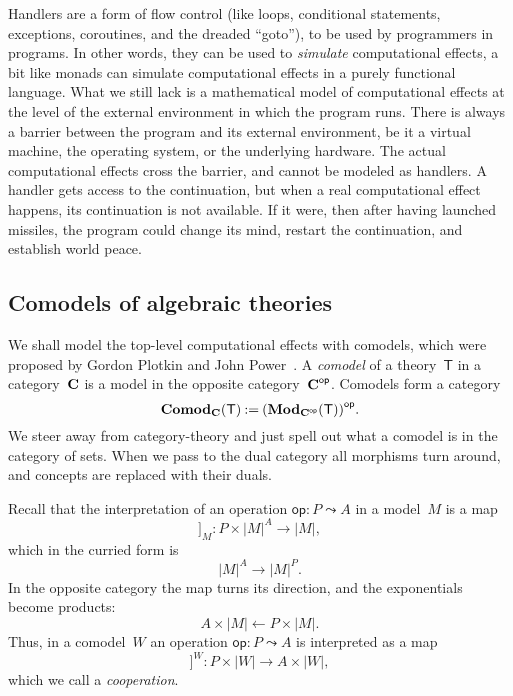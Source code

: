 \documentclass{amsart}
\newcommand{\theory}[1]{\mathsf{#1}} %
\newcommand{\ModC}[2]{\text{\textbf{Mod}}_{#1}(\theory{#2})} %
\newcommand{\ComodC}[2]{\text{\textbf{Comod}}_{#1}(\theory{#2})} %
\newcommand{\category}[1]{\text{\textbf{#1}}} %
\newcommand{\opcat}[1]{{#1}^{\mathsf{op}}} %
\newcommand{\opdecl}[3]{#1 : #2 \leadsto #3} %
\newcommand{\sem}[1]{[\![#1]\!]} %
\newcommand{\defeq}{\mathbin{{:}{=}}} %
\newcommand{\kode}[1]{\mathsf{#1}}
\begin{document}
Handlers are a form of flow control (like loops, conditional statements,
exceptions, coroutines, and the dreaded ``goto''), to be used by programmers in
programs. In other words, they can be used to \emph{simulate} computational
effects, a bit like monads can simulate computational effects in a purely
functional language. What we still lack is a mathematical model of computational
effects at the level of the external environment in which the program runs. There is
always a barrier between the program and its external environment, be it a
virtual machine, the operating system, or the underlying hardware. The actual
computational effects cross the barrier, and cannot be modeled as handlers. A
handler gets access to the continuation, but when a real computational effect
happens, its continuation is not available. If it were, then after having
launched missiles, the program could change its mind, restart the continuation,
and establish world peace.

\subsection{Comodels of algebraic theories}
\label{sec:comod-algebr-theor}

We shall model the top-level computational effects with comodels, which were
proposed by Gordon Plotkin and John
Power~\cite{plotkin08:_tensor_comod_model_operat_seman}. A \emph{comodel} of a
theory~$\theory{T}$ in a category~$\category{C}$ is a model in the opposite
category~$\opcat{\category{C}}$. Comodels form a category
%
\begin{equation*}
  \ComodC{\category{C}}{T} \defeq \opcat{(\ModC{\opcat{\category{C}}}{T})}.
\end{equation*}
%
We steer away from category-theory and just spell out what a comodel is in the
category of sets. When we pass to the dual category all morphisms turn around,
and concepts are replaced with their duals.

Recall that the interpretation of an operation $\opdecl{\kode{op}}{P}{A}$ in a
model~$M$ is a map
%
\begin{equation*}
  \sem{\kode{op}}_M :
  P \times |M|^A \longrightarrow |M|,
\end{equation*}
%
which in the curried form is
%
\begin{equation*}
  |M|^A \longrightarrow |M|^P.
\end{equation*}
%
In the opposite category the map turns its direction, and the exponentials
become products:
%
\begin{equation*}
  A \times |M| \longleftarrow P \times |M|.
\end{equation*}
%
Thus, in a comodel~$W$ an operation $\opdecl{\kode{op}}{P}{A}$ is interpreted as a map
%
\begin{equation*}
  \sem{\kode{op}}^W : P \times |W| \to A \times |W|,
\end{equation*}
%
which we call a \emph{cooperation}.
\end{document}
